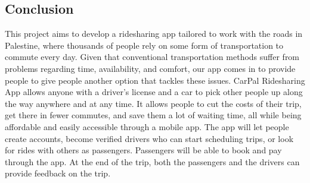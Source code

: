 \documentclass[a4paper, 12pt]{article} %
\begin{document}
        \subsection{Conclusion}
            This project aims to develop a ridesharing app tailored to work with the roads in Palestine, where thousands of people rely on some form of transportation to commute every day. Given that conventional transportation methods suffer from problems regarding time, availability, and comfort, our app comes in to provide people to give people another option that tackles these issues. CarPal Ridesharing App allows anyone with a driver's license and a car to pick other people up along the way anywhere and at any time. It allows people to cut the costs of their trip, get there in fewer commutes, and save them a lot of waiting time, all while being affordable and easily accessible through a mobile app. The app will let people create accounts, become verified drivers who can start scheduling trips, or look for rides with others as passengers. Passengers will be able to book and pay through the app. At the end of the trip, both the passengers and the drivers can provide feedback on the trip.
\end{document}
